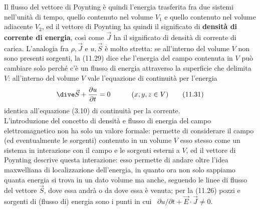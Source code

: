 Il flusso del vettore di Poynting \`e quindi l'energia trasferita fra due
sistemi nell'unit\`a di tempo, quello contenuto nel volume $V_1$ e quello
contenuto nel volume adiacente $V_2$, ed il vettore di Poynting ha quindi il
significato di \textbf{densit\`a di corrente di energia}, cos\`i come $\vec J$
ha il significato di densit\`a di corrente di carica. L'analogia fra
$\rho,\vec J$ e $u,\vec S$ \`e molto stretta: se all'interno del volume $V$ non
sono presenti sorgenti, la (11.29) dice che l'energia del campo contenuta in $V$
pu\`o cambiare solo perch\'e c'\`e un flusso di energia attraverso la superficie
che delimita $V$: all'interno del volume $V$ vale l'equazione di continuit\`a
per l'energia
\begin{equation}
  \dive\vec S+\frac{\partial u}{\partial t}=0\qquad\quad(x,y,z\in V)
  \tag{11.31}
\end{equation}
identica all'equazione (3.10) di continuit\`a per la corrente.\\
L'introduzione del concetto di densit\`a e flusso di energia del campo
elettromagnetico non ha solo un valore formale: permette di considerare il campo
(ed eventualmente le sorgenti) contenuto in un volume $V$ esso stesso come un
sistema in interazione con il campo e le sorgenti esterni a $V$, ed il vettore
di Poynting descrive questa interazione: esso permette di andare oltre l'idea
maxwelliana di localizzazione dell'energia, in quanto ora non solo sappiamo
quanta energia si trova in un dato volume ma anche, seguendo le linee di flusso
del vettore $\vec S$, dove essa andr\`a o da dove essa \`e venuta; per la
(11.26) pozzi e sorgenti di (flusso di) energia sono i punti in cui
\ $\partial u/\partial t+\vec E\cdot\vec J\ne0$.

